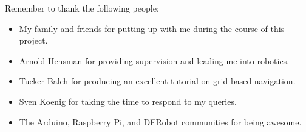 \def\baselinestretch{1.0}

\noindent 
Remember to thank the following people:

\begin{itemize}
\item My family and friends for putting up with me during the course of this project.
\item Arnold Hensman for providing supervision and leading me into robotics.
\item Tucker Balch for producing an excellent tutorial on grid based navigation.
\item Sven Koenig for taking the time to respond to my queries.
\item The Arduino, Raspberry Pi, and DFRobot communities for being awesome. 
\end{itemize}
